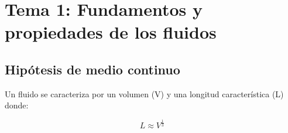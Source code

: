\section{Tema 1: Fundamentos y propiedades de los fluidos}
\subsection{Hipótesis de medio continuo}
Un fluido se caracteriza por un volumen (V) y una longitud característica (L) donde:

\[L \approx V^{\frac{1}{3}}\]

%	

